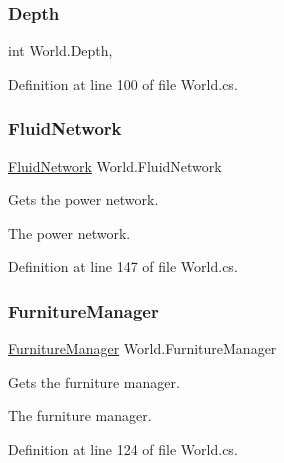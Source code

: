 \subsubsection{\texorpdfstring{Depth}{Depth}}
{\footnotesize\ttfamily int World.\+Depth\hspace{0.3cm}{\ttfamily [get]}, {}}



Definition at line 100 of file World.\+cs.

\mbox{\label{class_world_a5594338bb722fdc0ae176764e741ccde}} 
\subsubsection{\texorpdfstring{Fluid\+Network}{FluidNetwork}}
{\footnotesize\ttfamily \hyperlink{class_project_porcupine_1_1_power_network_1_1_fluid_network}{Fluid\+Network} World.\+Fluid\+Network\hspace{0.3cm}{\ttfamily [get]}}



Gets the power network. 

The power network.

Definition at line 147 of file World.\+cs.

\mbox{\label{class_world_afd8c3d504d1170f5c99b20162fc25a0e}} 
\subsubsection{\texorpdfstring{Furniture\+Manager}{FurnitureManager}}
{\footnotesize\ttfamily \hyperlink{class_furniture_manager}{Furniture\+Manager} World.\+Furniture\+Manager\hspace{0.3cm}{\ttfamily [get]}}



Gets the furniture manager. 

The furniture manager.

Definition at line 124 of file World.\+cs.

\mbox{\label{class_world_ace6c6d4a5ea86e39c20c6ad9cd573d08}} 
